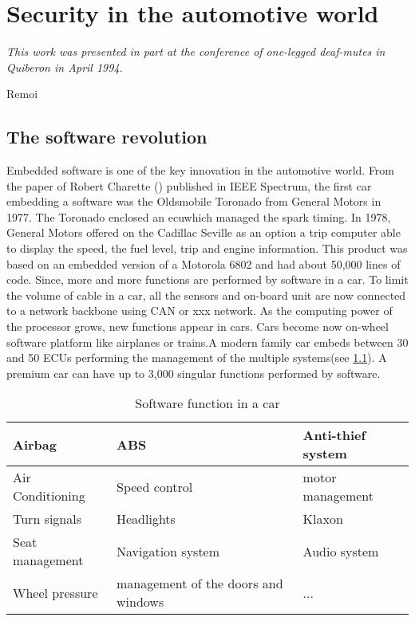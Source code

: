 
\chapter{Security in the automotive world} \label{CHAP2}
\smallskip
\hfill
\begin{minipage}[b]{8cm}
{\it This work was presented in part at the conference of one-legged deaf-mutes in Quiberon in April 1994.}
\end{minipage}
\begin{flushright} Remoi \end{flushright}
\vskip 2cm

\section {The software revolution}
\medskip
{\Huge E}mbedded software is one of the key innovation in the automotive world. From the paper of
 Robert Charette (\cite{Cha2009}) published in IEEE Spectrum, the first car embedding a software was the Oldsmobile Toronado from General Motors in 1977. The Toronado enclosed an \gls{ecu}\@ which managed the spark timing. In 1978, General Motors offered on the Cadillac Seville as an option a trip computer able to display the speed, the fuel level, trip and engine information. This product was based on an embedded version of a Motorola 6802 and had about 50,000 lines of code. Since, more and more functions are performed by software in a car. To limit the volume of cable in a car, all the sensors and on-board unit are now connected to a network backbone using CAN or xxx network. As the computing power of the processor grows, new functions appear in cars. Cars become now on-wheel software platform like airplanes or trains.A modern family car embeds between 30 and 50 ECUs performing the management of the multiple systems(see \ref{tab:soft}). A premium car can have up to 3,000 singular functions performed by software.   



\FloatBarrier
\begin{table}
\centering
\begin{tabular}{| l | l | l |}
\hline
Airbag & ABS & Anti-thief system \\
\hline
Air Conditioning & Speed control & motor management \\
\hline
Turn signals & Headlights & Klaxon \\
\hline
Seat management & Navigation system & Audio system\\
\hline
Wheel pressure & management of the doors and windows & ... \\
\hline
\end{tabular}
\caption{Software function in a car}
\label{tab:soft}
\end{table}
\FloatBarrier


